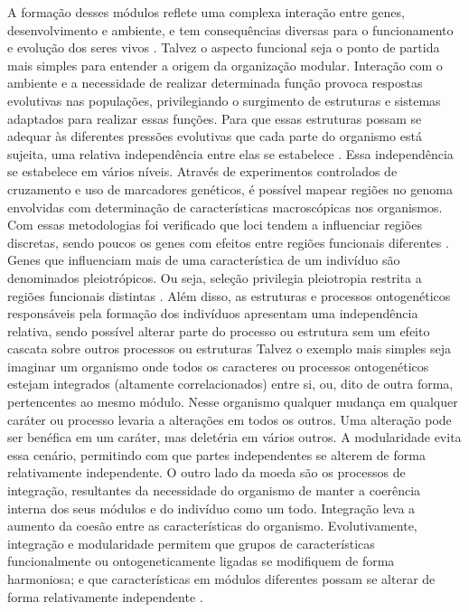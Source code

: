 A formação desses módulos reflete uma complexa interação entre genes,
desenvolvimento e ambiente, e tem consequências diversas para o
funcionamento e evolução dos seres vivos \citep{Wagner1996}.
Talvez o aspecto funcional seja o ponto de partida mais simples para
entender a origem da organização modular.
Interação com o ambiente e a necessidade de realizar determinada função
provoca respostas evolutivas nas populações, privilegiando o surgimento
de estruturas e sistemas adaptados para realizar essas funções.
Para que essas estruturas possam se adequar às diferentes pressões
evolutivas que cada parte do organismo está sujeita, uma relativa
independência entre elas se estabelece \citep{Wagner2007, Klingenberg2008}.
Essa independência se estabelece em vários níveis.
Através de experimentos controlados de cruzamento e uso de marcadores
genéticos, é possível mapear regiões no genoma envolvidas com
determinação de características macroscópicas nos organismos.
Com essas metodologias foi verificado que loci tendem a influenciar
regiões discretas, sendo poucos os genes com efeitos entre regiões
funcionais diferentes \citep{Cheverud1997}.
Genes que influenciam mais de uma característica de um indivíduo são
denominados pleiotrópicos.
Ou seja, seleção privilegia pleiotropia restrita a regiões funcionais
distintas \citep{Cheverud1984}.
Além disso, as estruturas e processos ontogenéticos responsáveis pela
formação dos indivíduos apresentam uma independência relativa, sendo
possível alterar parte do processo ou estrutura sem um efeito cascata
sobre outros processos ou estruturas \citep{Klingenberg2008}
Talvez o exemplo mais simples seja imaginar um organismo onde todos os
caracteres ou processos ontogenéticos estejam integrados (altamente
correlacionados) entre si, ou, dito de outra forma, pertencentes ao mesmo módulo.
Nesse organismo qualquer mudança em qualquer caráter ou processo levaria
a alterações em todos os outros.
Uma alteração pode ser benéfica em um caráter, mas deletéria em vários
outros.
A modularidade evita essa cenário, permitindo com que partes
independentes se alterem de forma relativamente independente.
O outro lado da moeda são os processos de integração, resultantes da
necessidade do organismo de manter a coerência interna dos seus módulos
e do indivíduo como um todo.
Integração leva a aumento da coesão entre as características
do organismo.
Evolutivamente, integração e modularidade permitem que grupos de
características funcionalmente ou ontogeneticamente ligadas se
modifiquem de forma harmoniosa; e que características em módulos
diferentes possam se alterar de forma relativamente independente
.

